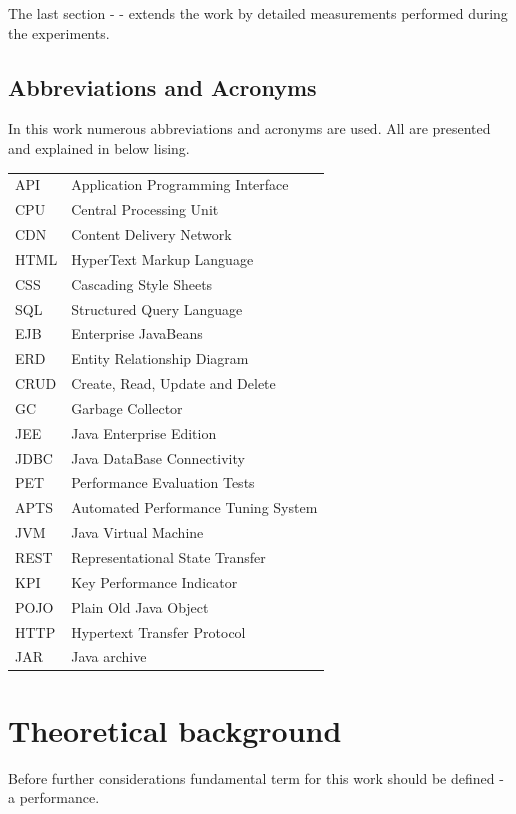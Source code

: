 \documentclass[12pt,a4paper]{article}
\begin{document}
The last section - \textit{} - extends the work by detailed measurements performed during the experiments. 

\pagebreak
\subsection{Abbreviations and Acronyms}
In this work numerous abbreviations and acronyms are used. All are presented and explained in below lising.


\def\arraystretch{1.5}
\begin{tabularx}{\textwidth}{p{1.5cm}X}
API & Application Programming Interface\\ 
CPU & Central Processing Unit\\ 
CDN & Content Delivery Network\\
HTML & HyperText Markup Language\\ 
CSS & Cascading Style Sheets\\ 
SQL & Structured Query Language\\ 
EJB & Enterprise JavaBeans\\ 
ERD & Entity Relationship Diagram\\ 
CRUD & Create, Read, Update and Delete\\ 
GC & Garbage Collector\\ 
JEE & Java Enterprise Edition\\
JDBC & Java DataBase Connectivity\\ 
PET & Performance Evaluation Tests \\ 
APTS & Automated Performance Tuning System \\ 
JVM & Java Virtual Machine\\ 
REST & Representational State Transfer \\ 
KPI & Key Performance Indicator\\
POJO & Plain Old Java Object\\
HTTP & Hypertext Transfer Protocol\\ 
JAR & Java archive\\
\end{tabularx}



\section{Theoretical background} \label{section:theoreticalbackground}
Before further considerations fundamental term for this work should be defined  - a performance. 
\end{document}
